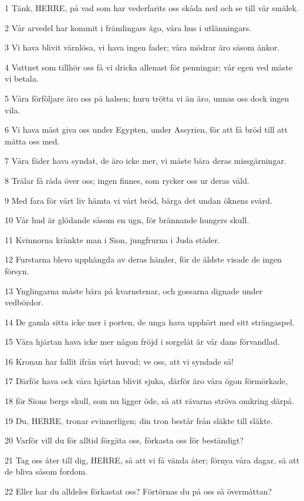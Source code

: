 \par 1 Tänk, HERRE, på vad som har vederfarits oss skåda ned och se till vår smälek.
\par 2 Vår arvedel har kommit i främlingars ägo, våra hus i utlänningars.
\par 3 Vi hava blivit värnlösa, vi hava ingen fader; våra mödrar äro såsom änkor.
\par 4 Vattnet som tillhör oss få vi dricka allenast för penningar; vår egen ved måste vi betala.
\par 5 Våra förföljare äro oss på halsen; huru trötta vi än äro, unnas oss dock ingen vila.
\par 6 Vi hava måst giva oss under Egypten, under Assyrien, för att få bröd till att mätta oss med.
\par 7 Våra fäder hava syndat, de äro icke mer, vi måste bära deras missgärningar.
\par 8 Trälar få råda över oss; ingen finnes, som rycker oss ur deras våld.
\par 9 Med fara för vårt liv hämta vi vårt bröd, bärga det undan öknens svärd.
\par 10 Vår hud är glödande såsom en ugn, för brännande hungers skull.
\par 11 Kvinnorna kränkte man i Sion, jungfrurna i Juda städer.
\par 12 Furstarna blevo upphängda av deras händer, för de äldste visade de ingen försyn.
\par 13 Ynglingarna måste bära på kvarnstenar, och gossarna dignade under vedbördor.
\par 14 De gamla sitta icke mer i porten, de unga hava upphört med sitt strängaspel.
\par 15 Våra hjärtan hava icke mer någon fröjd i sorgelåt är vår dans förvandlad.
\par 16 Kronan har fallit ifrån vårt huvud; ve oss, att vi syndade så!
\par 17 Därför hava ock våra hjärtan blivit sjuka, därför äro våra ögon förmörkade,
\par 18 för Sions bergs skull, som nu ligger öde, så att rävarna ströva omkring därpå.
\par 19 Du, HERRE, tronar evinnerligen; din tron består från släkte till släkte.
\par 20 Varför vill du för alltid förgäta oss, förkasta oss för beständigt?
\par 21 Tag oss åter till dig, HERRE, så att vi få vända åter; förnya våra dagar, så att de bliva såsom fordom.
\par 22 Eller har du alldeles förkastat oss? Förtörnas du på oss så övermåttan?


